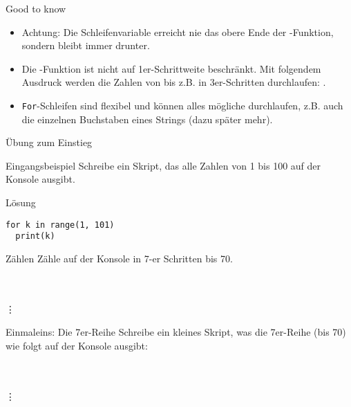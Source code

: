 \begin{frame}
\begin{block}{Good to know}
	\pause
	\begin{itemize}[<+->]
		\item Achtung: Die Schleifenvariable erreicht nie das obere Ende der -Funktion, sondern bleibt immer  drunter. 
		\item Die -Funktion ist nicht auf 1er-Schrittweite beschränkt. Mit folgendem Ausdruck werden die Zahlen von  bis  z.B. in 3er-Schritten durchlaufen: . 
		\item \texttt{For}-Schleifen sind flexibel und können alles mögliche durchlaufen, z.B. auch die einzelnen Buchstaben eines Strings (dazu später mehr).
	\end{itemize}
\end{block}
\end{frame}


\begin{fragile}{Übung zum Einstieg}
	
\begin{block}{Eingangsbeispiel}
\vspace{2pt}
Schreibe ein Skript, das alle Zahlen von 1 bis 100 auf der Konsole ausgibt. 

\vspace{12pt}
\begin{solutionblock}{Lösung}
\begin{verbatim}
for k in range(1, 101)
  print(k)
\end{verbatim}
\end{solutionblock}
\end{block}
\end{fragile}



\begin{fragile}[Übungen]

\begin{block}{Zählen}
\vspace{2pt}
Zähle auf der Konsole in 7-er Schritten bis 70.

 \\
 \\
\phantom{|} \vdots\\
\end{block}


\pause 

\vspace{12pt}

\begin{block}{Einmaleins: Die 7er-Reihe}
	\vspace{2pt}
	Schreibe ein kleines Skript, was die 7er-Reihe (bis 70) wie folgt auf der Konsole ausgibt: 
	
	\\	
	\\
	\phantom{4 mal} \vdots  
\end{block}
\end{fragile}


